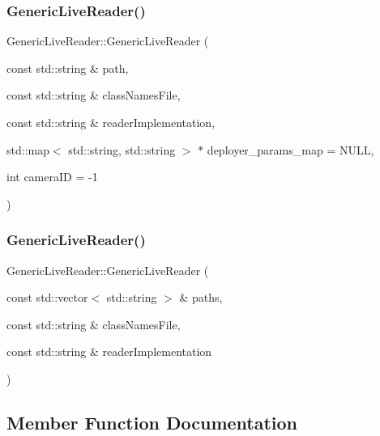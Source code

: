 \subsubsection{\texorpdfstring{Generic\+Live\+Reader()}{GenericLiveReader()}\hspace{0.1cm}{\footnotesize\ttfamily [1/2]}}
{\footnotesize\ttfamily Generic\+Live\+Reader\+::\+Generic\+Live\+Reader (\begin{DoxyParamCaption}\item[{const std\+::string \&}]{path,  }\item[{const std\+::string \&}]{class\+Names\+File,  }\item[{const std\+::string \&}]{reader\+Implementation,  }\item[{std\+::map$<$ std\+::string, std\+::string $>$ $\ast$}]{deployer\+\_\+params\+\_\+map = {\ttfamily NULL},  }\item[{int}]{camera\+ID = {\ttfamily -\/1} }\end{DoxyParamCaption})}

\mbox{\label{class_generic_live_reader_a93d5a40fbeb5f241553aa0eca08c3191}} 
\subsubsection{\texorpdfstring{Generic\+Live\+Reader()}{GenericLiveReader()}\hspace{0.1cm}{\footnotesize\ttfamily [2/2]}}
{\footnotesize\ttfamily Generic\+Live\+Reader\+::\+Generic\+Live\+Reader (\begin{DoxyParamCaption}\item[{const std\+::vector$<$ std\+::string $>$ \&}]{paths,  }\item[{const std\+::string \&}]{class\+Names\+File,  }\item[{const std\+::string \&}]{reader\+Implementation }\end{DoxyParamCaption})}



\subsection{Member Function Documentation}
\mbox{\label{class_generic_live_reader_aaec6f0e9697d31fe2b9f836b22805aa0}} 
